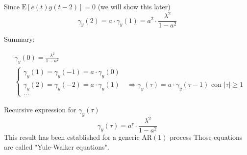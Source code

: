 Since $\mathrm{E}[e(t) y(t-2)]=0$ (we will show this later)
$$
\gamma_{y}(2)=a \cdot \gamma_{y}(1)=a^{2} \cdot \frac{\lambda^{2}}{1-a^{2}}
$$

Summary:

\begin{align*}
	&\gamma_{y}(0)=\frac{\lambda^{2}}{1-a^{2}} \\
	&\left\{\begin{array}{l}
		\gamma_{y}(1)=\gamma_{y}(-1)=a \cdot \gamma_{y}(0) \\
		\gamma_{y}(2)=\gamma_{y}(-2)=a \cdot \gamma_{y}(1) \quad \Rightarrow \gamma_{y}(\tau)=a \cdot \gamma_{y}(\tau-1) \text { con }|\tau| \geq 1 \\
		\ldots
	\end{array}\right.
\end{align*}

Recursive expression for $\gamma_{y}(\tau)$
$$
\gamma_{y}(\tau)=a^{\tau} \cdot \frac{\lambda^{2}}{1-a^{2}}
$$
This result has been established for a generic $\mathrm{AR}(1)$ process
Those equations are called "Yule-Walker equations".